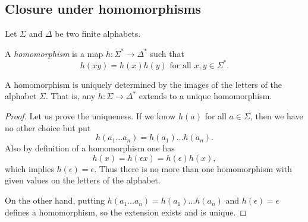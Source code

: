 \begin{page}
\setcounter{section}{3}
\setcounter{subsection}{3}
\setcounter{dfn}{7}
\label{portion:1136}

\subsection{Closure under homomorphisms}
Let $\Sigma$ and $\Delta$ be two finite alphabets.


\end{page}

\begin{page}
\setcounter{section}{3}
\setcounter{subsection}{3}
\setcounter{dfn}{8}
\label{portion:1138}

\begin{dfn}
A \emph{homomorphism} is a map $h \colon \Sigma^* \to \Delta^*$ such that
\[
h(xy) = h(x)h(y) \text{ for all }x, y \in \Sigma^*.
\]
\end{dfn}

\end{page}

\begin{page}
\setcounter{section}{3}
\setcounter{subsection}{3}
\setcounter{dfn}{9}
\label{portion:1141}

\begin{lem}
A homomorphism is uniquely determined by the images of the letters of the alphabet $\Sigma$.
That is, any $h \colon \Sigma \to \Delta^*$ extends to a unique homomorphism.
\end{lem}

\end{page}

\begin{page}
\setcounter{section}{3}
\setcounter{subsection}{3}
\setcounter{dfn}{9}
\label{portion:1142}

\begin{proof}
Let us prove the uniqueness.
If we know $h(a)$ for all $a \in \Sigma$, then we have no other choice but put
\[
h(a_1 \ldots a_n) = h(a_1) \ldots h(a_n).
\]
Also by definition of a homomorphism one has
\[
h(x) = h(\epsilon x) = h(\epsilon) h(x),
\]
which implies $h(\epsilon) = \epsilon$.
Thus there is no more than one homomorphism with given values on the letters of the alphabet.

On the other hand, putting $h(a_1 \ldots a_n) = h(a_1) \ldots h(a_n)$ and $h(\epsilon) = \epsilon$ defines a homomorphism,
so the extension exists and is unique.
\end{proof}


\end{page}

